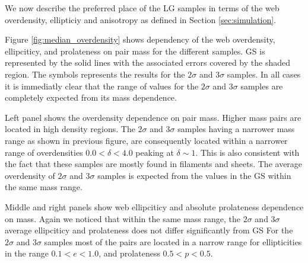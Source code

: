 \documentclass{emulateapj}
\begin{document}
We now describe the preferred place of the LG samples in terms of the
web overdensity, ellipticiy and anisotropy as defined in Section
\ref{sec:simulation}. 

Figure \ref{fig:median_overdensity} shows dependency of the web overdensity,
ellipciticy, and prolateness on pair mass for the different samples.
GS is represented by the solid lines with the associated 
errors covered by the shaded region. 
The symbols represents the results for the $2\sigma$ and $3\sigma$
samples.  
In all cases it is immediatly clear that the range of values for the
$2\sigma$ and $3\sigma$ samples are completely expected from its mass
dependence.  

Left panel shows the overdensity dependence on pair mass. 
Higher mass pairs are located in high density regions.
The $2\sigma$ and $3\sigma$ samples having a narrower mass range as 
shown in previous figure, are consequently located within a narrower 
range of overdensities $0.0<\delta<4.0$ peaking at $\delta \sim 1$. 
This is also consistent with the fact that these samples are mostly 
found in filaments and sheets. 
The average overdensity of $2\sigma$ and $3\sigma$ samples is expected
from the values in the GS within the same mass range.

Middle and right panels show web ellipciticy and absolute prolateness
dependence on mass. Again we noticed that within the same mass range,
the $2\sigma$ and $3\sigma$ average ellipciticy and prolateness does not
differ significantly from GS
For the $2\sigma$ and $3\sigma$ samples most of the pairs are located
in a narrow range for ellipticities in the range $0.1<e<1.0$, and
prolateness $0.5<p<0.5$.


\end{document}
